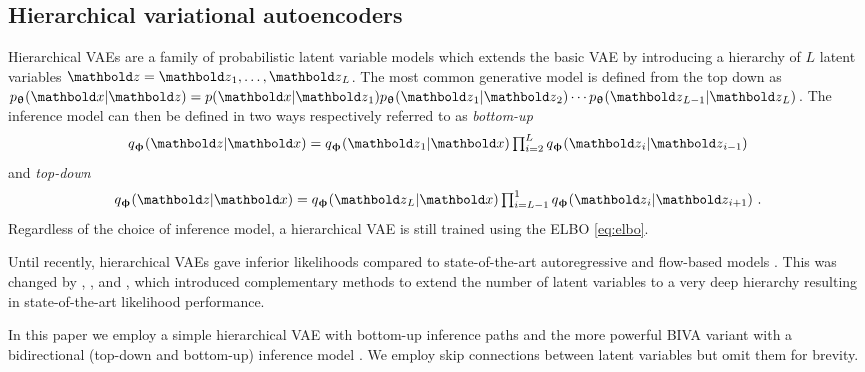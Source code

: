 \subsection{Hierarchical variational autoencoders}\label{sec:background-hie-VAE}
Hierarchical VAEs are a family of probabilistic latent variable models which extends the basic VAE by introducing a hierarchy of $L$ latent variables $\zb=\zb_1, \dots, \zb_L$.
The most common generative model is defined from the top down as $p_\thetab(\xb|\zb)=p(\xb|\zb_1)p_\thetab(\zb_1|\zb_2)\cdots p_\thetab(\zb_{L-1}|\zb_L)$.
The inference model can then be defined in two ways respectively referred to as \textit{bottom-up} \cite{burda_importance_2016}
\begin{equation}
    q_\phib(\zb|\xb) = q_\phib(\zb_1|\xb)\textstyle\prod_{i=2}^{L} q_\phib(\zb_i|\zb_{i-1})
\end{equation}
and \textit{top-down} \cite{sonderby_ladder_2016}
\begin{equation}
    q_\phib(\zb|\xb) = q_\phib(\zb_L|\xb)\textstyle\prod_{i=L-1}^{1} q_\phib(\zb_{i}|\zb_{i+1}) \ .
\end{equation}
Regardless of the choice of inference model, a hierarchical VAE is still trained using the ELBO \eqref{eq:elbo}.

Until recently, hierarchical VAEs gave inferior likelihoods compared to state-of-the-art autoregressive \cite{ho_flow_2019} and flow-based models \cite{salimans_pixelcnn_2017}.
This was changed by \textcite{maaloe_biva_2019}, \textcite{vahdat_nvae_2020}, and \textcite{child_very_2021}, which introduced complementary methods to extend the number of latent variables to a very deep hierarchy resulting in state-of-the-art likelihood performance.

In this paper we employ a simple hierarchical VAE with bottom-up inference paths and the more powerful BIVA variant with a bidirectional (top-down and bottom-up) inference model \parencite{maaloe_biva_2019}. We employ skip connections between latent variables but omit them for brevity.



